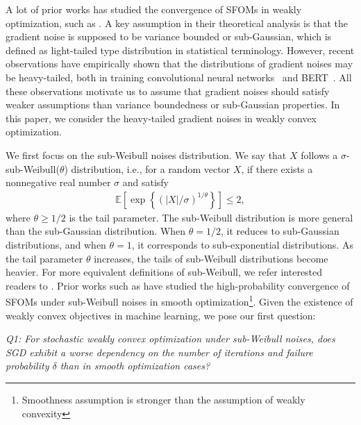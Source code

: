 \documentclass{article}
\def \E {\mathbb{E}}
\begin{document}
A lot of prior works has studied the convergence of SFOMs in weakly optimization, such as \citep{Davis2_2018,davis2018stochasticmodelbasedminimizationweakly,Alacaoglu_2020,9345428,li_2022,gao2023delayedstochasticalgorithmsdistributed,WenzhiGao_QiDeng_2024,quanqihu_2024,liao2024errorboundsplcondition,hong_2025}. A key assumption in their theoretical analysis is that the gradient noise is supposed to be variance bounded or sub-Gaussian, which is defined as light-tailed type distribution in statistical terminology. However, recent observations have empirically shown that the distributions of gradient noises may be heavy-tailed, both in training convolutional neural networks~\citep{simsekli2019tail} and BERT~\citep{devlin2019bert}. All these observations motivate us to assume that gradient noises should satisfy weaker assumptions than variance boundedness or sub-Gaussian properties. In this paper, we consider the heavy-tailed gradient noises in weakly convex optimization.

We first focus on the sub-Weibull noises distribution. We say that $X$ follows a $\sigma$-sub-Weibull($\theta$) distribution, i.e., for a random vector $X$, if there exists a nonnegative real number $\sigma$ and satisfy
\begin{align}\label{def:sub_weibull}
        \E\left[\exp\left\{\left(|X|/\sigma\right)^{1/\theta}\right\}\right]\leq 2,
    \end{align}
where $\theta\geq1/2$ is the tail parameter. 
The sub-Weibull distribution is more general than the sub-Gaussian distribution. When $\theta = 1/2$, it reduces to sub-Gaussian distributions, and when $\theta = 1$, it corresponds to sub-exponential distributions. As the tail parameter $\theta$ increases, the tails of sub-Weibull distributions become heavier. For more equivalent definitions of sub-Weibull, we refer interested readers to \citep{vladimirova2020sub}. Prior works such as \citep{madden2020high, lishaojie_liuyong_2022, li2025sharper} have studied the high-probability convergence of SFOMs under sub-Weibull noises in smooth optimization\footnote{Smoothness assumption is stronger than the assumption of weakly convexity}.  Given the existence of weakly convex objectives in machine learning, we pose our first question:

\begin{center}
\textit{Q1: For stochastic weakly convex optimization under sub-Weibull noises, does SGD exhibit a worse dependency on the number of iterations and failure probability \(\delta\) than in smooth optimization cases?}
\end{center}
\end{document}
